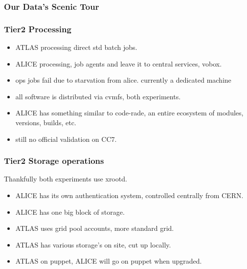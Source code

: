 \documentclass{beamer}
\begin{document}
\begin{frame}
  \frametitle{Our Data's Scenic Tour}
\end{frame}

\begin{frame}
  \frametitle{Tier2 Processing}
  \begin{itemize}
    \item ATLAS processing direct std batch jobs.
    \item ALICE processing, job agents and leave it to central services, vobox.
    \item ops jobs fail due to starvation from alice. currently a dedicated machine
    \item all software is distributed via cvmfs, both experiments.
    \item ALICE has something similar to code-rade, an entire ecosystem of modules, versions, builds, etc.
    \item still no official validation on CC7.
  \end{itemize}
\end{frame}

\begin{frame}
  \frametitle{Tier2 Storage operations}
  Thankfully both experiments use xrootd.
  \begin{itemize}
    \item ALICE has its own authentication system, controlled centrally from CERN.
    \item ALICE has one big block of storage.
    \item ATLAS uses grid pool accounts, more standard grid.
    \item ATLAS has various storage's on site, cut up locally.
    \item ATLAS on puppet, ALICE will go on puppet when upgraded.
  \end{itemize}
\end{frame}
\end{document}
